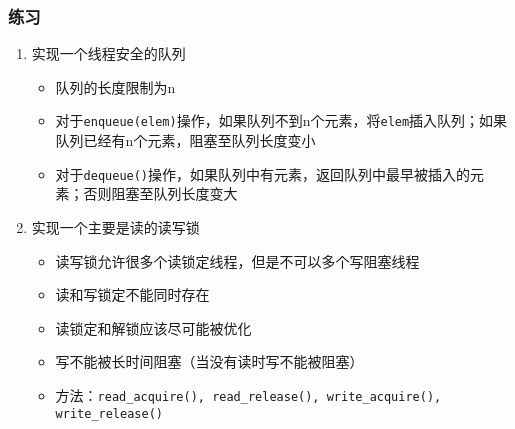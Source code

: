 \begin{comment}
import threading

s = 0
s_lock = threading.Lock()
r = 0
r_lock = threading.Lock()
r_cv = threading.Condition(r_lock)

class MyThread(threading.Thread) :
	def run(self) :
		global s, s_lock, r, r_lock, r_cv
		for i in range(100000) :
			s_lock.acquire()
			s += 1
			s_lock.release()
		with r_lock :
			r -= 1
			r_cv.notify()

if __name__ == '__main__' :
	for i in range(10) :
		with r_lock :
			r += 1
		MyThread().start()
	with r_lock :
		while r :
			r_cv.wait()
	print(s)
\end{comment}

\begin{frame} [fragile]
	\frametitle{练习}
	\begin{enumerate}
	\item 实现一个线程安全的队列
		\begin{itemize}
		\item 队列的长度限制为n
		\item 对于\texttt{enqueue(elem)}操作，如果队列不到n个元素，将\texttt
				{elem}插入队列；如果队列已经有n个元素，阻塞至队列长度变小
		\item 对于\texttt{dequeue()}操作，如果队列中有元素，返回队列中最早被插入的元素；否则阻塞至队列长度变大
		\end{itemize}
	\item 实现一个主要是读的读写锁
		\begin{itemize}
		\item 读写锁允许很多个读锁定线程，但是不可以多个写阻塞线程
		\item 读和写锁定不能同时存在
		\item 读锁定和解锁应该尽可能被优化
		\item 写不能被长时间阻塞（当没有读时写不能被阻塞）
		\item 方法：\texttt{read\_acquire(), read\_release(), write\_acquire(), write\_release()}
		\end{itemize}
\begin{comment}
# from `locate blocked.py`
class ReadWriteLock :
	def __init__(self) :
		self.writing = False	# whether a writer is waiting / writing
		self.reading = 0		# 0: no readers; > 0: number of readers
		self.lock = threading.Lock()
		self.read_cv = threading.Condition(self.lock)
		self.write_cv = threading.Condition(self.lock)
	def read_acquire(self) :
		with self.lock :
			while self.writing :
				self.read_cv.wait()
			self.reading += 1
	def read_release(self) :
		with self.lock :
			self.reading -= 1
			if self.writing and not self.reading :
				self.write_cv.notify()
	def write_acquire(self) :
		with self.lock :
			while self.writing or self.reading :
				self.write_cv.wait()
			self.writing = True
	def write_release(self) :
		with self.lock :
			self.writing = False
			self.read_cv.notify_all()
\end{comment}
	\end{enumerate}
\end{frame}

